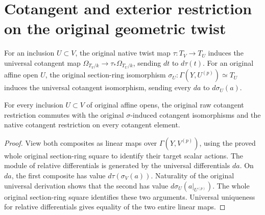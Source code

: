 \section{Cotangent and exterior restriction on the original geometric twist}

\begin{definition}
\label{def:cartier-geometric-native-cotangent-restriction}
\leanok
{}
For an inclusion $U\subset V$, the original native twist map
$\tau:T_V\to T_U$ induces the universal cotangent map
$\Omega_{T_V/k}\to\tau_*\Omega_{T_U/k}$, sending $dt$ to $d\tau(t)$.
For an original affine open $U$, the original section-ring isomorphism
$\sigma_U:\Gamma(Y,U^{(p)})\simeq T_U$ induces the universal
cotangent isomorphism, sending every $da$ to $d\sigma_U(a)$.
\end{definition}

\begin{theorem}
\label{thm:cartier-geometric-raw-cotangent-restriction}
\leanok
{}
For every inclusion $U\subset V$ of original affine opens, the
original raw cotangent restriction commutes with the original
$\sigma$-induced cotangent isomorphisms and the native cotangent
restriction on every cotangent element.
\end{theorem}
\begin{proof}
View both composites as linear maps over $\Gamma(Y,V^{(p)})$,
using the proved whole original section-ring square to identify
their target scalar actions. The module of relative differentials
is generated by the universal differentials $da$. On $da$, the
first composite has value $d\tau(\sigma_V(a))$. Naturality of the
original universal derivation shows that the second has value
$d\sigma_U(a|_{U^{(p)}})$. The whole original section-ring square
identifies these two arguments. Universal uniqueness for relative
differentials gives equality of the two entire linear maps.
\end{proof}

